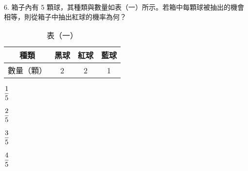 \documentclass[12pt]{article}
\begin{document}
\begin{problem}
  \item[6.] 箱子內有 5 顆球，其種類與數量如表（一）所示。若箱中每顆球被抽出的機會相等，則從箱子中抽出紅球的機率為何？
  \begin{table}[ht]
    \centering
    \renewcommand{\arraystretch}{1.2}
    \vspace*{-1ex}
    \caption*{表（一）}
    \vspace*{-1ex}
    \begin{tabular}{|c|c|c|c|}
      \hline
      種類 & 黑球 & 紅球 & 藍球 \\ \hline
      數量（顆） & 2 & 2 & 1 \\ \hline
    \end{tabular}
    \vspace*{-2ex}
  \end{table}
  \begin{choices}
    \item $\fraction{1}{5}$
    \item $\fraction{2}{5}$
    \item $\fraction{3}{5}$
    \item $\fraction{4}{5}$
  \end{choices}
\end{problem}
\end{document}
